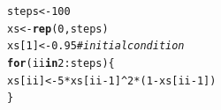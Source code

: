 \documentclass[Tutorial]{../cbg}\usepackage[]{graphicx}\usepackage[]{color}
\makeatletter
\newcommand{\hlnum}[1]{\textcolor[rgb]{0.686,0.059,0.569}{#1}}%
\newcommand{\hlcom}[1]{\textcolor[rgb]{0.678,0.584,0.686}{\textit{#1}}}%
\newcommand{\hlopt}[1]{\textcolor[rgb]{0,0,0}{#1}}%
\newcommand{\hlstd}[1]{\textcolor[rgb]{0.345,0.345,0.345}{#1}}%
\newcommand{\hlkwa}[1]{\textcolor[rgb]{0.161,0.373,0.58}{\textbf{#1}}}%
\newcommand{\hlkwb}[1]{\textcolor[rgb]{0.69,0.353,0.396}{#1}}%
\newcommand{\hlkwd}[1]{\textcolor[rgb]{0.737,0.353,0.396}{\textbf{#1}}}%
\newenvironment{kframe}{%
 \def\at@end@of@kframe{}%
 \ifinner\ifhmode%
  \def\at@end@of@kframe{\end{minipage}}%
  \begin{minipage}{\columnwidth}%
 \fi\fi%
 \def\FrameCommand##1{\hskip\@totalleftmargin \hskip-\fboxsep
 \colorbox{shadecolor}{##1}\hskip-\fboxsep
     \hskip-\linewidth \hskip-\@totalleftmargin \hskip\columnwidth}%
 \MakeFramed {\advance\hsize-\width
   \@totalleftmargin\z@ \linewidth\hsize
   \@setminipage}}%
 {\par\unskip\endMakeFramed%
 \at@end@of@kframe}
\newenvironment{knitrout}{}{} %
\makeatother
\begin{document}
\begin{knitrout}
\color{fgcolor}\begin{kframe}
\begin{alltt}
\hlstd{steps} \hlkwb{<-} \hlnum{100}
\hlstd{xs} \hlkwb{<-} \hlkwd{rep}\hlstd{(}\hlnum{0}\hlstd{, steps)}
\hlstd{xs[}\hlnum{1}\hlstd{]} \hlkwb{<-} \hlnum{0.95}  \hlcom{# initial condition}
\hlkwa{for} \hlstd{(ii} \hlkwa{in} \hlnum{2}\hlopt{:}\hlstd{steps) \{}
    \hlstd{xs[ii]} \hlkwb{<-} \hlnum{5} \hlopt{*} \hlstd{xs[ii} \hlopt{-} \hlnum{1}\hlstd{]}\hlopt{^}\hlnum{2} \hlopt{*} \hlstd{(}\hlnum{1} \hlopt{-} \hlstd{xs[ii} \hlopt{-} \hlnum{1}\hlstd{])}
\hlstd{\}}
\end{alltt}
\end{kframe}
\end{knitrout}
\end{document}
